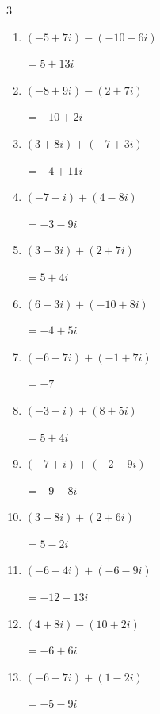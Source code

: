 \begin{multicols}{3}
\begin{enumerate}
  \item $\displaystyle (-5+7i) - (-10-6i)$

        $\displaystyle =5+13i$

  \item $\displaystyle (-8+9i) - (2+7i)$

        $\displaystyle =-10+2i$

  \item $\displaystyle (3+8i) + (-7+3i)$

        $\displaystyle =-4+11i$

  \item $\displaystyle (-7-i) + (4-8i)$

        $\displaystyle =-3-9i$

  \item $\displaystyle (3-3i) + (2+7i)$

        $\displaystyle =5+4i$

  \item $\displaystyle (6-3i) + (-10+8i)$

        $\displaystyle =-4+5i$

\columnbreak %

\resetques

  \item $\displaystyle (-6-7i) + (-1+7i)$

        $\displaystyle =-7$

  \item $\displaystyle (-3-i) + (8+5i)$

        $\displaystyle =5+4i$

  \item $\displaystyle (-7+i) + (-2-9i)$

        $\displaystyle =-9-8i$

  \item $\displaystyle (3-8i) + (2+6i)$

        $\displaystyle =5-2i$

  \item $\displaystyle (-6-4i) + (-6-9i)$

        $\displaystyle =-12-13i$

  \item $\displaystyle (4+8i) - (10+2i)$

        $\displaystyle =-6+6i$

  \item $\displaystyle (-6-7i) + (1-2i)$

        $\displaystyle =-5-9i$


\end{enumerate}
\end{multicols}
